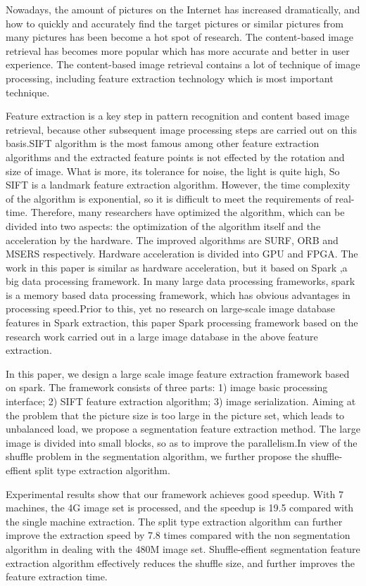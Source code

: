 \begin{eabstract}
Nowadays, the amount of pictures on the Internet has increased dramatically, and how to quickly and accurately find the target pictures or similar pictures from many pictures has been become a hot spot of research. The content-based image retrieval has becomes more popular which has more accurate and better in user experience. The content-based image retrieval contains a lot of technique of image processing, including feature extraction technology which is most important technique.

Feature extraction is a key step in pattern recognition and content based image retrieval, because other subsequent image processing steps are carried out on this basis.SIFT algorithm is the most famous among other feature extraction algorithms and the extracted feature points is not effected by the rotation and size of image. What is more, its tolerance for noise, the light is quite high, So SIFT is a landmark feature extraction algorithm. However, the time complexity of the algorithm is exponential, so it is difficult to meet the requirements of real-time. Therefore, many researchers have optimized the algorithm, which can be divided into two aspects: the optimization of the algorithm itself and the acceleration by the hardware. The improved algorithms are SURF, ORB and MSERS respectively. Hardware acceleration is divided into GPU and FPGA. The work in this paper is similar as hardware acceleration, but it based on Spark ,a big data processing framework. In many large data processing frameworks, spark is a memory based data processing framework, which has obvious advantages in processing speed.Prior to this, yet no research on large-scale image database features in Spark extraction, this paper Spark processing framework based on the research work carried out in a large image database in the above feature extraction.

In this paper, we design a large scale image feature extraction framework based on spark. The framework consists of three parts: 1) image basic processing interface; 2) SIFT feature extraction algorithm; 3) image serialization. Aiming at the problem that the picture size is too large in the picture set, which leads to unbalanced load, we propose a segmentation feature extraction method. The large image is divided into small blocks, so as to improve the parallelism.In view of the shuffle problem in the segmentation algorithm, we further propose the shuffle-effient split type extraction algorithm.

Experimental results show that our framework achieves good speedup. With 7 machines, the 4G image set is processed, and the speedup is 19.5 compared with the single machine extraction. The split type extraction algorithm can further improve the extraction speed by 7.8 times compared with the non segmentation algorithm in dealing with the 480M image set. Shuffle-effient segmentation feature extraction algorithm effectively reduces the shuffle size, and further improves the feature extraction time.

\end{eabstract}

